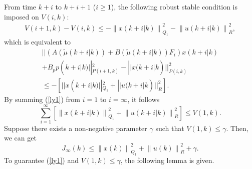 \documentclass{singlecol-new}
\theoremstyle{TH}{
\newtheorem{lemma}{Lemma}
\newtheorem{theorem}[lemma]{Theorem}
\newtheorem{corrolary}[lemma]{Corrolary}
\newtheorem{conjecture}[lemma]{Conjecture}
\newtheorem{proposition}[lemma]{Proposition}
\newtheorem{claim}[lemma]{Claim}
\newtheorem{stheorem}[lemma]{Wrong Theorem}
\newtheorem{algorithm}{Algorithm}
}
\theoremstyle{THrm}{
\newtheorem{definition}{Definition}[section]
\newtheorem{question}{Question}[section]
\newtheorem{remark}{Remark}
\newtheorem{scheme}{Scheme}
}
\theoremstyle{THhit}{
\newtheorem{case}{Case}[section]
}
\begin{document}
From time $k + i$ to $k + i + 1$ ($i \ge 1$), the following robust
stable condition is imposed on $V(i,k)$:
\begin{eqnarray*}
V(i + 1,k) - V(i,k) \leq  - {\left\| {x(k + i|k)} \right\|_{Q_1 }^2
- \left\| {u(k + i|k)} \right\|_R^2 } ,
\end{eqnarray*}
which is equivalent to
\begin{eqnarray}\label{ly1}
|| (A(\tilde \mu (k + i|k)) + B(\tilde \mu (k + i|k))F_i )x(k + i|k)
 \nonumber
\\+B_p p(k + i|k) ||_{P(i + 1,k)}^2 - || x(k + i|k)
||_{P(i,k)}^2 \nonumber\\\leq  - [ || x(k + i|k)||_{Q_1 }^2 +||u(k +
i|k) ||_R^2 ].
\end{eqnarray}
By summing (\ref{ly1}) from $i = 1$ to $i = \infty $, it follows
\begin{equation}
\sum\limits_{i = 1}^\infty  {\left[ {\left\| {x(k + i|k)}
\right\|_{Q_1 }^2  + \left\| {u(k + i|k)} \right\|_R^2 } \right]}
\leq  V(1,k).
\end{equation}
Suppose there exists a non-negative parameter $\gamma$ such that
$V(1,k)\leq \gamma$. Then, we can get
\begin{equation}\label{sum1}
J_\infty  (k)    \leq  \left\| {x(k)} \right\|_{Q_1 }^2  + \left\|
{u(k)} \right\|_R^2  + \gamma.
\end{equation}
To guarantee (\ref{ly1}) and $V(1,k)\leq \gamma$, the following
lemma is given.
\end{document}
